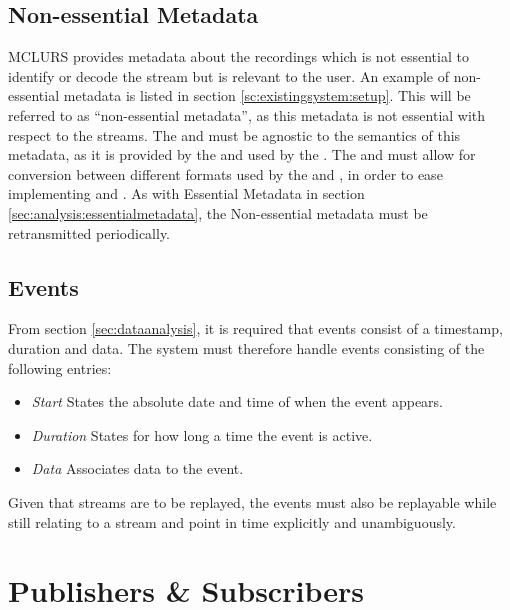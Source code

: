 \subsection{Non-essential Metadata} \label{sec:analysis:nonessentialmetadata} 
\ac{MCLURS} provides metadata about the recordings which is not essential to identify or decode the stream but is relevant to the user. An example of non-essential metadata is listed in section \ref{sc:existingsystem:setup}. This will be referred to as ``non-essential metadata'', as this metadata is not essential with respect to the streams.
The  and  must be agnostic to the semantics of this metadata, as it is provided by the  and used by the . The  and  must allow for conversion between different formats used by the  and , in order to ease implementing  and . As with Essential Metadata in section \ref{sec:analysis:essentialmetadata}, the Non-essential metadata must be retransmitted periodically.




\subsection{Events} \label{sec:analysis:event}
From section \ref{sec:dataanalysis}, it is required that events consist of a timestamp, duration and data. The system must therefore handle events consisting of the following entries:
\begin{itemize}
	\item \textit{Start} States the absolute date and time of when the event appears. 
	\item \textit{Duration} States for how long a time the event is active.
	\item \textit{Data} Associates data to the event. 
\end{itemize}

Given that streams are to be replayed, the events must also be replayable while still relating to a stream and point in time explicitly and unambiguously.


\section{Publishers \& Subscribers} \label{sec:analysis:pubsub}
